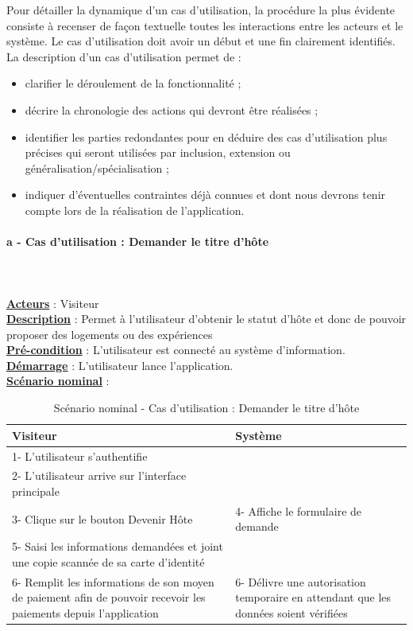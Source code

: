 Pour détailler la dynamique d'un cas d’utilisation, la procédure la plus évidente consiste à recenser de façon textuelle toutes les interactions entre les acteurs et le système. Le cas d’utilisation doit avoir un début et une fin clairement identifiés. La description d’un cas d’utilisation permet de :
\begin{itemize}
\item[\textbullet] clarifier le déroulement de la fonctionnalité ;
\item[\textbullet] décrire la chronologie des actions qui devront être réalisées ;
\item[\textbullet] identifier les parties redondantes pour en déduire des cas d’utilisation plus précises qui seront utilisées par inclusion, extension ou généralisation/spécialisation ;
\item[\textbullet] indiquer d’éventuelles contraintes déjà connues et dont nous devrons tenir compte lors de la réalisation de l'application.
\end{itemize}

\newpage

\paragraph{a - Cas d'utilisation : Demander le titre d’hôte} 
$ $\\$ $\\\underline{\textbf{Acteurs}} : Visiteur
\\\underline{\textbf{Description}}  : Permet à l’utilisateur d’obtenir le statut d'hôte et donc de pouvoir proposer des logements ou des expériences
\\\underline{\textbf{Pré-condition}} : L'utilisateur est connecté au système d’information.
\\\underline{\textbf{Démarrage}} : L’utilisateur lance l’application.
\\\underline{\textbf{Scénario nominal}} :

\begin{table}[H]
\begin{center}
\begin{tabular}{|p{8cm}|p{8cm}|}
\hline
Visiteur & Système\\
\hline
1- L’utilisateur s’authentifie & $ $\\
\hline	
2- L’utilisateur arrive sur l’interface principale & $ $\\
\hline 	
3- Clique sur le bouton Devenir Hôte & 4- Affiche le formulaire de demande\\
\hline
5- Saisi les informations demandées et joint une copie scannée de sa carte d'identité & $ $\\
\hline	
6- Remplit les informations de son moyen de paiement afin de pouvoir recevoir les paiements depuis l’application & 6- Délivre une autorisation temporaire en attendant que les données soient vérifiées\\
\hline
\end{tabular}
\caption{Scénario nominal - Cas d'utilisation : Demander le titre d'hôte}
\end{center}
\end{table}

